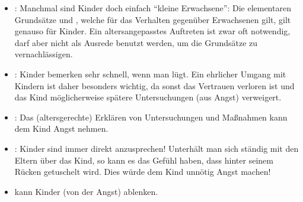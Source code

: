 \documentclass[
ngerman,
paper=a4,
asymmetric,
fontsize=10pt,
draft=false,
numbers=noenddot,
bibtotocnumbered,
footnotes=multiple,
]{scrreprt}
\begin{document}
{\begin{itemize}
  \item {}: Manchmal sind Kinder doch
  einfach \enquote{kleine Erwachsene}: Die elementaren Grundsätze
   und , welche für das
  Verhalten gegenüber Erwachsenen gilt, gilt genauso für
  Kinder. Ein altersangepasstes Auftreten ist zwar oft
  notwendig, darf aber nicht als Ausrede benutzt werden, um
  die Grundsätze zu vernachlässigen.
% 
  \item {}: Kinder bemerken sehr schnell, wenn man lügt. Ein
  ehrlicher Umgang mit Kindern ist daher besonders wichtig, da sonst das
  Vertrauen verloren ist und das Kind möglicherweise spätere Untersuchungen
  (aus Angst) verweigert.
  \item {}: Das (altersgerechte) Erklären von Untersuchungen und
  Maßnahmen kann dem Kind Angst nehmen.
  \item {}: Kinder sind immer direkt anzusprechen!
  Unterhält man sich ständig mit den Eltern über das Kind, so kann es das Gefühl
  haben, dass hinter seinem Rücken getuschelt wird. Dies würde dem Kind unnötig
  Angst machen!
  \item {} kann Kinder (von der Angst) ablenken. 

\end{itemize}}
\end{document}
